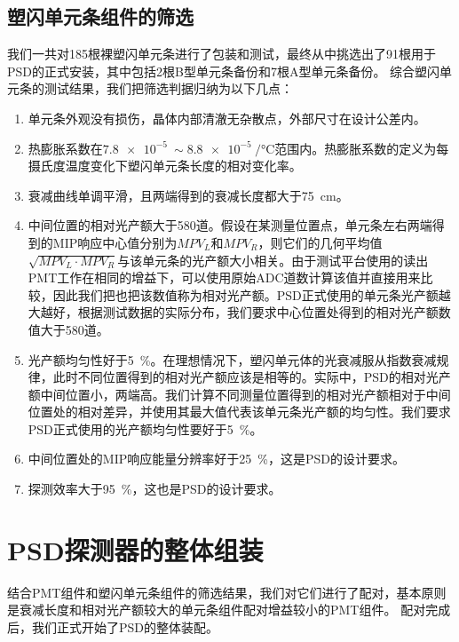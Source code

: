 \subsection{塑闪单元条组件的筛选}
\label{sec:construction:bar_selection}
我们一共对185根裸塑闪单元条进行了包装和测试，最终从中挑选出了91根用于PSD的正式安装，其中包括2根B型单元条备份和7根A型单元条备份。
综合塑闪单元条的测试结果，我们把筛选判据归纳为以下几点：
\begin{enumerate}
	\item 单元条外观没有损伤，晶体内部清澈无杂散点，外部尺寸在设计公差内。
	\item 热膨胀系数在$\SI{7.8e-5}{}\sim \SI{8.8e-5}{\per\celsius}$范围内。热膨胀系数的定义为每摄氏度温度变化下塑闪单元条长度的相对变化率。
	\item 衰减曲线单调平滑，且两端得到的衰减长度都大于\SI{75}{cm}。
	\item 中间位置的相对光产额大于580道。假设在某测量位置点，单元条左右两端得到的MIP响应中心值分别为$MPV_L$和$MPV_R$，则它们的几何平均值$\sqrt{MPV_L \cdot MPV_R}$与该单元条的光产额大小相关。由于测试平台使用的读出PMT工作在相同的增益下\parencite{bar_test_2015}，可以使用原始ADC道数计算该值并直接用来比较，因此我们把也把该数值称为相对光产额。PSD正式使用的单元条光产额越大越好，根据测试数据的实际分布，我们要求中心位置处得到的相对光产额数值大于580道。
	\item 光产额均匀性好于\SI{5}{\percent}。在理想情况下，塑闪单元体的光衰减服从指数衰减规律，此时不同位置得到的相对光产额应该是相等的。实际中，PSD的相对光产额中间位置小，两端高。我们计算不同测量位置得到的相对光产额相对于中间位置处的相对差异，并使用其最大值代表该单元条光产额的均匀性。我们要求PSD正式使用的光产额均匀性要好于\SI{5}{\percent}。
	\item 中间位置处的MIP响应能量分辨率好于\SI{25}{\percent}，这是PSD的设计要求。
	\item 探测效率大于\SI{95}{\percent}，这也是PSD的设计要求。
\end{enumerate}

\section{PSD探测器的整体组装}
\label{sec:construction:psd_assembly}

结合PMT组件和塑闪单元条组件的筛选结果，我们对它们进行了配对，基本原则是衰减长度和相对光产额较大的单元条组件配对增益较小的PMT组件。
配对完成后，我们正式开始了PSD的整体装配。

